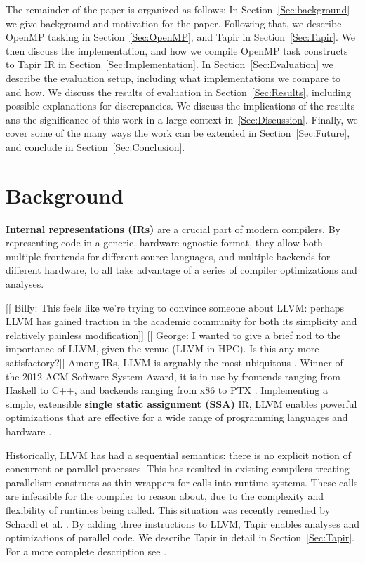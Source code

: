\documentclass[sigconf]{acmart}
\newcommand{\wmnote}[1]{{\scriptsize \color{red} [[ Billy: #1]]}}
\newcommand{\gsnote}[1]{{\scriptsize \color{blue} [[ George: #1]]}}
\begin{document}
The remainder of the paper is organized as follows: In Section~\ref{Sec:background} 
we give background and motivation for the paper. Following that, we describe OpenMP
tasking in Section~\ref{Sec:OpenMP}, and Tapir in Section~\ref{Sec:Tapir}. We then 
discuss the implementation, and how we compile OpenMP task constructs to Tapir IR in
Section~\ref{Sec:Implementation}. In Section~\ref{Sec:Evaluation} we describe the 
evaluation setup, including what implementations we compare to and how. We discuss
the results of evaluation in Section~\ref{Sec:Results}, including possible
explanations for discrepancies. We discuss the implications of the results ans the
significance of this work in a large context in~\ref{Sec:Discussion}. Finally,
we cover some of the many ways the work can be extended in
Section~\ref{Sec:Future}, and conclude in Section~\ref{Sec:Conclusion}.

\section{Background} \label{Sec:Background}

\textbf{Internal representations (IRs)} are a crucial part of modern compilers.
By representing code in a generic, hardware-agnostic format, they allow both
multiple frontends for different source languages, and multiple backends for
different hardware, to all take advantage of a series of compiler optimizations
and analyses. 

\wmnote{This feels like we're trying to convince someone about LLVM: perhaps
LLVM has gained traction in the academic community for both its simplicity and
relatively painless modification} 
\gsnote{I wanted to give a brief nod to the importance of LLVM, given the venue
(LLVM in HPC). Is this any more satisfactory?} 
Among IRs, LLVM is arguably the most ubiquitous \cite{llvm}. Winner of the
2012 ACM Software System Award, it is in use by frontends ranging from Haskell
to C++, and backends ranging from x86 to PTX \cite{}. Implementing a simple,
extensible \textbf{single static assignment (SSA)} IR, LLVM enables powerful
optimizations that are effective for a wide range of programming languages and
hardware \cite{llvm}. 

Historically, LLVM has had a sequential semantics: there is no explicit notion
of concurrent or parallel processes. This has resulted in existing compilers
treating parallelism constructs as thin wrappers for calls into runtime
systems. These calls are infeasible for the compiler to reason about, due to
the complexity and flexibility of runtimes being called. This situation was
recently remedied by Schardl et al.  \cite{tapir}. By adding three instructions
to LLVM, Tapir enables analyses and optimizations of parallel code. We describe
Tapir in detail in Section~\ref{Sec:Tapir}. For a more complete description see
\cite{tapir}. 
\end{document}
